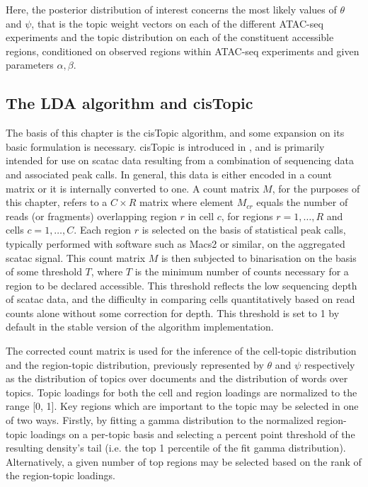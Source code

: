 Here, the posterior distribution of interest concerns the most likely values of $\theta$ and $\psi$, that is the topic weight vectors on each of the different ATAC-seq experiments and the topic distribution on each of the constituent accessible regions, conditioned on observed regions within ATAC-seq experiments and given parameters $\alpha, \beta$.

\subsection{The LDA algorithm and cisTopic}

The basis of this chapter is the cisTopic algorithm, and some expansion on its basic formulation is necessary. cisTopic is introduced in \textcite{BravoGonzalez-Blas2019}, and is primarily intended for use on \gls{scatac} data resulting from a combination of sequencing data and associated peak calls. In general, this data is either encoded in a count matrix or it is internally converted to one. A count matrix $M$, for the purposes of this chapter, refers to a $C \times R$ matrix where element $M_{cr}$ equals the number of reads (or fragments) overlapping region $r$ in cell $c$, for regions $r=1,\ldots,R$ and cells $c=1,\ldots,C$. Each region $r$ is selected on the basis of statistical peak calls, typically performed with software such as Macs2 or similar, on the aggregated \gls{scatac} signal. This count matrix $M$ is then subjected to binarisation on the basis of some threshold $T$, where $T$ is the minimum number of counts necessary for a region to be declared accessible. This threshold reflects the low sequencing depth of \gls{scatac} data, and the difficulty in comparing cells quantitatively based on read counts alone without some correction for depth. This threshold is set to 1 by default in the stable version of the algorithm implementation.

The corrected count matrix is used for the inference of the cell-topic distribution and the region-topic distribution, previously represented by $\theta$ and $\psi$ respectively as the distribution of topics over documents and the distribution of words over topics. Topic loadings for both the cell and region loadings are normalized to the range [0, 1]. Key regions which are important to the topic may be selected in one of two ways. Firstly, by fitting a gamma distribution to the normalized region-topic loadings on a per-topic basis and selecting a percent point threshold of the resulting density's tail (i.e. the top 1 percentile of the fit gamma distribution). Alternatively, a given number of top regions may be selected based on the rank of the region-topic loadings.  

